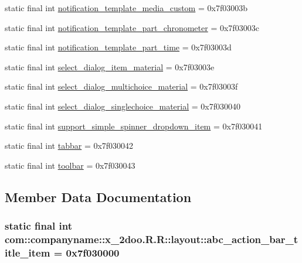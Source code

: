 \begin{CompactItemize}
static final int \hyperlink{classcom_1_1companyname_1_1x__2doo_1_1_r_1_1layout_9aa5caf8f3c0cb4ec146cfc4c9ae24e4}{notification\_\-template\_\-media\_\-custom} = 0x7f03003b
\item 
static final int \hyperlink{classcom_1_1companyname_1_1x__2doo_1_1_r_1_1layout_3e3b4c116973b46c1987032236469058}{notification\_\-template\_\-part\_\-chronometer} = 0x7f03003c
\item 
static final int \hyperlink{classcom_1_1companyname_1_1x__2doo_1_1_r_1_1layout_f1ad73822c04c64ae0698b8778859aa8}{notification\_\-template\_\-part\_\-time} = 0x7f03003d
\item 
static final int \hyperlink{classcom_1_1companyname_1_1x__2doo_1_1_r_1_1layout_4cecdd86b705006a5cf1d767e44e5306}{select\_\-dialog\_\-item\_\-material} = 0x7f03003e
\item 
static final int \hyperlink{classcom_1_1companyname_1_1x__2doo_1_1_r_1_1layout_915de13166edfc86ba9e4678005897c9}{select\_\-dialog\_\-multichoice\_\-material} = 0x7f03003f
\item 
static final int \hyperlink{classcom_1_1companyname_1_1x__2doo_1_1_r_1_1layout_a6c4a646ccd4dac6dc87b8321c224aae}{select\_\-dialog\_\-singlechoice\_\-material} = 0x7f030040
\item 
static final int \hyperlink{classcom_1_1companyname_1_1x__2doo_1_1_r_1_1layout_f36684119fcf8562464260a774150f80}{support\_\-simple\_\-spinner\_\-dropdown\_\-item} = 0x7f030041
\item 
static final int \hyperlink{classcom_1_1companyname_1_1x__2doo_1_1_r_1_1layout_d9e52c63f44fd954d81dd3c91262f679}{tabbar} = 0x7f030042
\item 
static final int \hyperlink{classcom_1_1companyname_1_1x__2doo_1_1_r_1_1layout_a2b0a3718b21516835f7859d7b9ee841}{toolbar} = 0x7f030043
\end{CompactItemize}


\subsection{Member Data Documentation}
\hypertarget{classcom_1_1companyname_1_1x__2doo_1_1_r_1_1layout_7f6dbd97ddaf1e2ec9ac5585bf25c39d}{
\subsubsection[{abc\_\-action\_\-bar\_\-title\_\-item}]{\setlength{\rightskip}{0pt plus 5cm}static final int com::companyname::x\_\-2doo.R.R::layout::abc\_\-action\_\-bar\_\-title\_\-item = 0x7f030000}}
\label{classcom_1_1companyname_1_1x__2doo_1_1_r_1_1layout_7f6dbd97ddaf1e2ec9ac5585bf25c39d}


